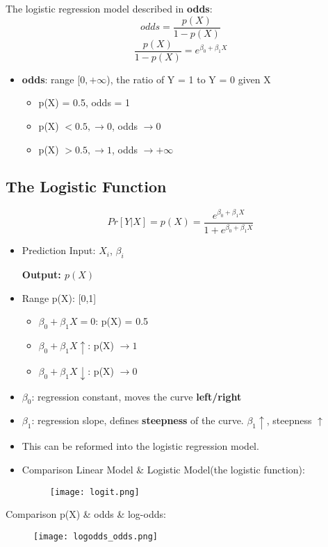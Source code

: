 The logistic regression model described in \textbf{odds}: 
$$odds = \frac{p(X)}{1 - p(X)}$$
$$\frac{p(X)}{1 - p(X)} = e^{\beta_0 + \beta_1 X}$$
\begin{itemize}
	\item \textbf{odds}: range [$0, +\infty$), the ratio of Y = 1 to Y = 0 given X
	\begin{itemize}
		\item p(X) = 0.5, odds = 1
		\item p(X) $< 0.5, \rightarrow 0$, odds $\rightarrow 0$
		\item p(X) $> 0.5, \rightarrow 1$, odds $\rightarrow +\infty$
	\end{itemize}
\end{itemize}

\subsection{The Logistic Function}
$$Pr[Y|X] = p(X) = \dfrac{e^{\beta_0 + \beta_1 X}}{1 + e^{\beta_0 + \beta_1 X}}$$
\begin{itemize}
	\item Prediction Input: $X_i$, $\beta_i$
	
	\textbf{Output: $p(X)$}		 
	
	\item Range p(X): [0,1]
	\begin{itemize}
		\item $\beta_0 + \beta_1 X = 0$:  p(X) = 0.5 
		\item $\beta_0 + \beta_1 X  \uparrow$:  p(X) $\rightarrow 1$
		\item $\beta_0 + \beta_1 X  \downarrow$:  p(X) $\rightarrow 0$
	\end{itemize}
	\item $\beta_0$: regression constant, moves the curve \textbf{left/right}
	\item $\beta_1$: regression slope, defines \textbf{steepness} of the curve. $\beta_1 \uparrow$, steepness $\uparrow$
	\item This can be reformed into the logistic regression model. 
	\item Comparison Linear Model \& Logistic Model(the logistic function):
	\begin{figure}[H]
		\centering
		\texttt{[image: logit.png]}
	\end{figure}
\end{itemize}
Comparison p(X) \& odds \& log-odds:
\begin{figure}[H]
	\centering
	\texttt{[image: logodds\_odds.png]}
\end{figure}

